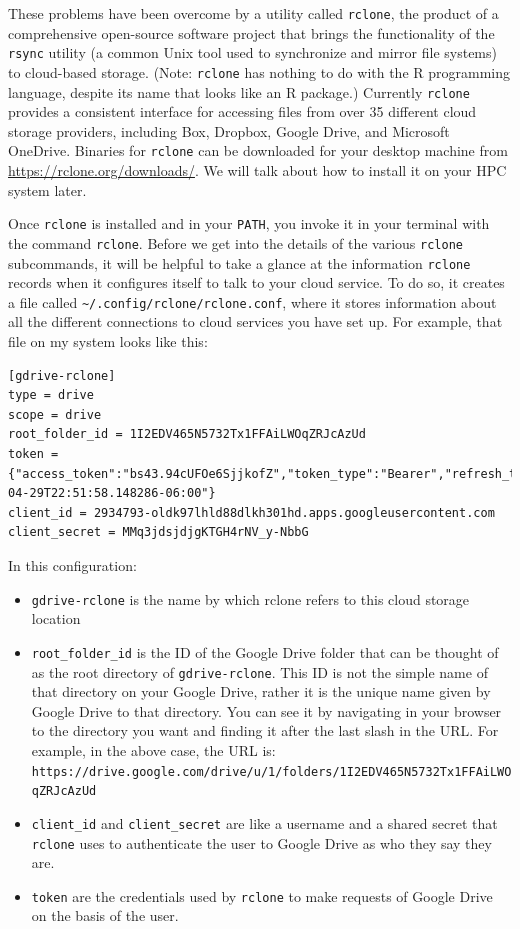 \documentclass[]{krantz}
\providecommand{\tightlist}{%
  \setlength{\itemsep}{0pt}\setlength{\parskip}{0pt}}
\begin{document}
These problems have been overcome by a utility called \texttt{rclone}, the product of a
comprehensive open-source software project that brings the functionality of the
\texttt{rsync} utility (a common Unix tool used to synchronize and mirror file systems)
to cloud-based storage. (Note: \texttt{rclone} has nothing to do with the R programming
language, despite its name that looks like an R package.)
Currently \texttt{rclone} provides a consistent interface for accessing
files from over 35 different cloud storage providers, including Box, Dropbox, Google Drive,
and Microsoft OneDrive. Binaries for \texttt{rclone} can be downloaded for your desktop
machine from \url{https://rclone.org/downloads/}. We will
talk about how to install it on your HPC system later.

Once \texttt{rclone} is installed and in your \texttt{PATH}, you invoke it in your terminal
with the command \texttt{rclone}. Before we get into the details of the various \texttt{rclone} subcommands,
it will be helpful to take a glance at the information \texttt{rclone} records when it
configures itself to talk to your cloud service. To do so, it creates a file called \texttt{\textasciitilde{}/.config/rclone/rclone.conf}, where it stores information about all the different
connections to cloud services you have set up. For example, that
file on my system looks like this:

\begin{verbatim}
[gdrive-rclone]
type = drive
scope = drive
root_folder_id = 1I2EDV465N5732Tx1FFAiLWOqZRJcAzUd
token = {"access_token":"bs43.94cUFOe6SjjkofZ","token_type":"Bearer","refresh_token":"1/MrtfsRoXhgc","expiry":"2019-04-29T22:51:58.148286-06:00"}
client_id = 2934793-oldk97lhld88dlkh301hd.apps.googleusercontent.com
client_secret = MMq3jdsjdjgKTGH4rNV_y-NbbG
\end{verbatim}

In this configuration:

\begin{itemize}
\tightlist
\item
  \texttt{gdrive-rclone} is the name by which rclone refers to this cloud storage location
\item
  \texttt{root\_folder\_id} is the ID of the Google Drive folder that can be thought of as the root directory of \texttt{gdrive-rclone}. This ID is not the simple name of that directory on
  your Google Drive, rather it is the unique name given by Google Drive to that directory.
  You can see it by navigating in your browser to the directory you want and finding it
  after the last slash in the URL. For example, in the above case, the URL is:
  \texttt{https://drive.google.com/drive/u/1/folders/1I2EDV465N5732Tx1FFAiLWOqZRJcAzUd}
\item
  \texttt{client\_id} and \texttt{client\_secret} are like a username and a shared secret that \texttt{rclone} uses
  to authenticate the user to Google Drive as who they say they are.
\item
  \texttt{token} are the credentials used by \texttt{rclone} to make requests of Google Drive on the basis
  of the user.
\end{itemize}
\end{document}
